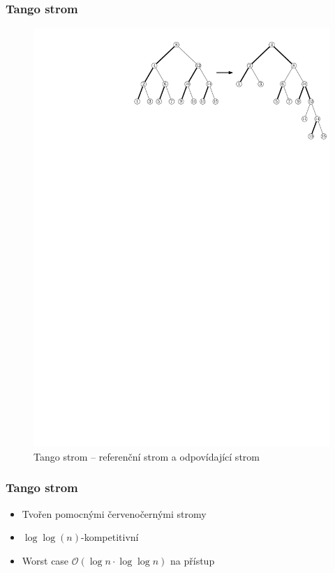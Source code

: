 \documentclass{beamer}
\begin{document}
\begin{frame}
\frametitle{Tango strom}


\begin{figure}[h!]

  \centering
  \includegraphics[width=.9\linewidth]{tango}
\caption{Tango strom -- referenční strom a odpovídající  strom} 

\label{obr:cut_tango} 
 
\end{figure}
\end{frame}


\begin{frame}
\frametitle{Tango strom}
\begin{itemize}
\item Tvořen pomocnými červenočernými stromy
\item $\log\log(n)$-kompetitivní
\item Worst case $\mathcal O(\log n \cdot \log\log n)$ na přístup
\end{itemize}
\end{frame}
\end{document}
